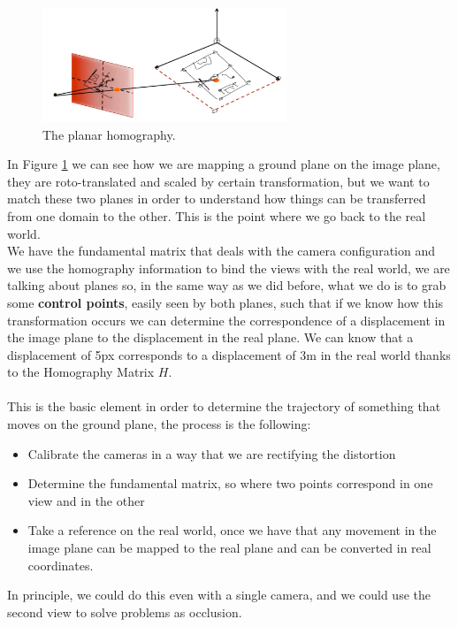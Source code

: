 \begin{figure}[H]
    \centering
    \includegraphics[width=0.65\textwidth]{Figures/homo.png}
    \caption{The planar homography.}
    \label{fig:homo}
\end{figure}

In Figure \ref{fig:homo} we can see how we are mapping a ground plane on the image plane, they are roto-translated and scaled by certain transformation, but we want to match these two planes in order to understand how things can be transferred from one domain to the other. This is the point where we go back to the real world.
\\
We have the fundamental matrix that deals with the camera configuration and we use the homography information to bind the views with the real world, we are talking about planes so, in the same way as we did before, what we do is to grab some \textbf{control points}, easily seen by both planes, such that if we know how this transformation occurs we can determine the correspondence of a displacement in the image plane to the displacement in the real plane. We can know that a displacement of 5px corresponds to a displacement of 3m in the real world thanks to the Homography Matrix \(H\).
\\\\
This is the basic element in order to determine the trajectory of something that moves on the ground plane, the process is the following:
\begin{itemize}
    \item Calibrate the cameras in a way that we are rectifying the distortion
    \item Determine the fundamental matrix, so where two points correspond in one view and in the other
    \item Take a reference on the real world, once we have that any movement in the image plane can be mapped to the real plane and can be converted in real coordinates.
\end{itemize}

In principle, we could do this even with a single camera, and we could use the second view to solve problems as occlusion. 

